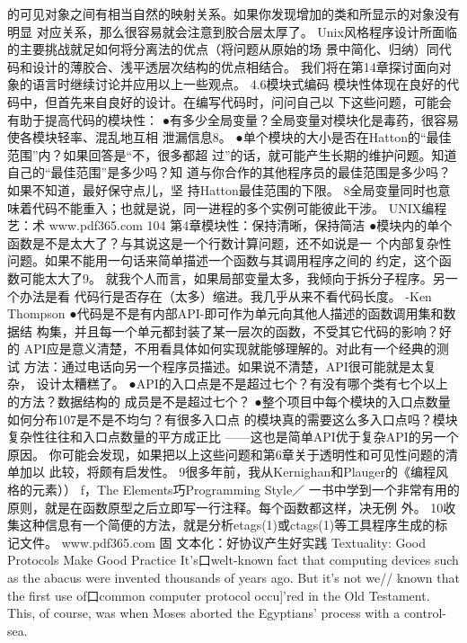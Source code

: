 \documentclass[11pt,oneside]{book}
\begin{document}
\begin{common-format}
的可见对象之间有相当自然的映射关系。如果你发现增加的类和所显示的对象没有明显
对应关系，那么很容易就会注意到胶合层太厚了。
    Unix风格程序设计所面临的主要挑战就足如何将分离法的优点（将问题从原始的场
景中简化、归纳）同代码和设计的薄胶合、浅平透层次结构的优点相结合。
    我们将在第14章探讨面向对象的语言时继续讨论并应用以上一些观点。
4.6模块式编码
    模块性体现在良好的代码中，但首先来自良好的设计。在编写代码时，问问自己以
下这些问题，可能会有助于提高代码的模块性：
●有多少全局变量？全局变量对模块化是毒药，很容易使各模块轻率、混乱地互相
  泄漏信息8。
●单个模块的大小是否在Hatton的“最佳范围”内？如果回答是“不，很多都超
  过”的话，就可能产生长期的维护问题。知道自己的“最佳范围”是多少吗？知
  道与你合作的其他程序员的最佳范围是多少吗？如果不知道，最好保守点儿，坚
  持Hatton最佳范围的下限。
8全局变量同时也意味着代码不能重入；也就是说，同一进程的多个实例可能彼此干涉。
UNIX编程艺：术
    www.pdf365.com
104
第4章模块性：保持清晰，保持简洁
●模块内的单个函数是不是太大了？与其说这是一个行数计算问题，还不如说是一
    个内部复杂性问题。如果不能用一句话来简单描述一个函数与其调用程序之间的
    约定，这个函数可能太大了9。
    就我个人而言，如果局部变量太多，我倾向于拆分子程序。另一个办法是看
代码行是否存在（太多）缩进。我几乎从来不看代码长度。
-Ken Thompson
    ●代码是不是有内部API-即可作为单元向其他人描述的函数调用集和数据结
    构集，并且每一个单元都封装了某一层次的函数，不受其它代码的影响？好的
    API应是意义清楚，不用看具体如何实现就能够理解的。对此有一个经典的测试
    方法：通过电话向另一个程序员描述。如果说不清楚，API很可能就是太复杂，
    设计太糟糕了。
    ●API的入口点是不是超过七个？有没有哪个类有七个以上的方法？数据结构的
    成员是不是超过七个？
    ●整个项目中每个模块的入口点数量如何分布107是不是不均匀？有很多入口点
    的模块真的需要这么多入口点吗？模块复杂性往往和入口点数量的平方成正比
    ——这也是简单API优于复杂API的另一个原因。
    你可能会发现，如果把以上这些问题和第6章关于透明性和可见性问题的清单加以
此较，将颇有启发性。
9很多年前，我从Kernighan和Plauger的《编程风格的元素））  f，The Elements巧Programming Style／
一书中学到一个非常有用的原则，就是在函数原型之后立即写一行注释。每个函数都这样，决无例
外。
10收集这种信息有一个简便的方法，就是分析etags(1)或ctags(1)等工具程序生成的标记文件。
www.pdf365.com
固
文本化：好协议产生好实践
Textuality: Good Protocols Make
Good Practice
    It's口welt-known fact that computing devices such as the abacus were invented thousands
of years ago. But it's not we// known that the first use of口common computer protocol
occu]’red in the Old Testament. This, of course, was when Moses aborted the Egyptians'
process with a control-sea.

\end{common-format}
\end{document}
